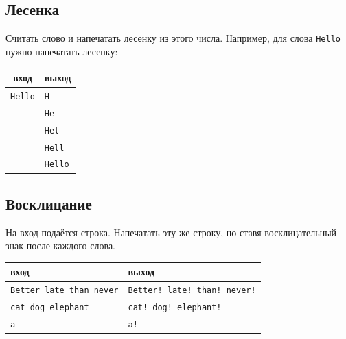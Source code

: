 \documentclass{article}
\begin{document}
\subsection{Лесенка}
Считать слово и напечатать лесенку из этого числа. Например, для слова \texttt{Hello} нужно напечатать лесенку: 
\begin{center}
\begin{center}
\begin{tabular}{ c | l }
 вход & выход \\ \hline
 \texttt{Hello} & \texttt{H}  \\ 
 & \texttt{He} \\
 & \texttt{Hel} \\
 & \texttt{Hell} \\
 & \texttt{Hello}\\ 
\end{tabular}
\end{center}
\end{center}



\subsection{Восклицание}
На вход подаётся строка. Напечатать эту же строку, но ставя восклицательный знак после каждого слова.
\begin{center}
\begin{tabular}{ l | l }
 вход & выход \\ \hline
 \texttt{Better late than never} & \texttt{Better! late! than! never!} \\
 \texttt{cat \quad dog elephant} & \texttt{cat! \quad dog! elephant!}  \\ 
 \texttt{a} & \texttt{a!} \\
\end{tabular}
\end{center}
\end{document}
